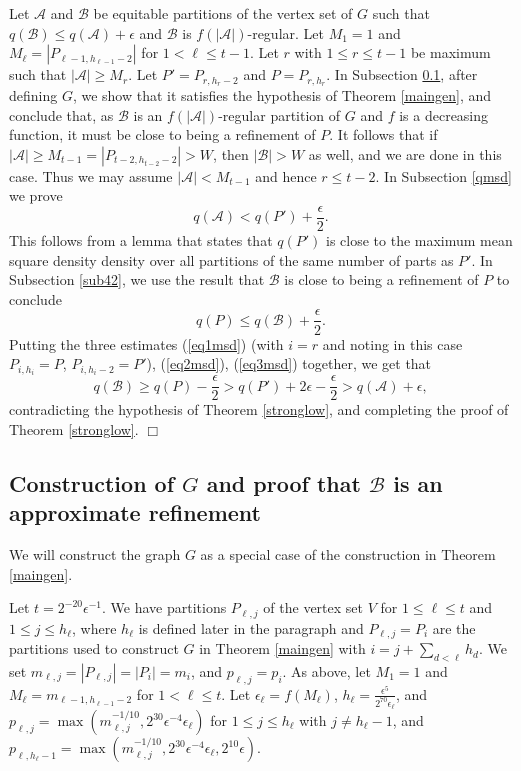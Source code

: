 \documentclass[11pt]{article}
\newcommand{\qed}{\hfill \ensuremath{\Box}}
\begin{document}
Let $\mathcal{A}$ and $\mathcal{B}$ be equitable partitions of the vertex set of $G$ such that 
$q(\mathcal{B}) \leq q(\mathcal{A})+\epsilon$ and $\mathcal{B}$ is
$f(|\mathcal{A}|)$-regular. Let $M_1=1$ and $M_{\ell}=|P_{\ell-1,h_{\ell-1}-2}|$ for $1<\ell \leq t-1$. Let $r$ with $1 \leq r \leq t-1$ be maximum such that $|\mathcal{A}| \geq M_r$. Let
$P'=P_{r,h_r-2}$ and $P=P_{r,h_r}$. In Subsection
\ref{sub41}, after defining $G$, we show that it satisfies the hypothesis of
Theorem \ref{maingen}, and conclude that, as $\mathcal{B}$ is an
$f(|\mathcal{A}|)$-regular partition of $G$ and $f$ is a decreasing function, it must be close to being a
refinement of $P$. It follows that if $|\mathcal{A}| \geq M_{t-1}=|P_{t-2,h_{t-2}-2}| > W$, then $|\mathcal{B}| > W$ as well, and we are done in this case. Thus we may assume $|\mathcal{A}|<M_{t-1}$ and hence $r \leq t-2$. 
In Subsection \ref{qmsd} we prove
\begin{equation}\label{eq2msd}
q(\mathcal{A})<q(P')+\frac{\epsilon}{2}.\end{equation} This follows from a
lemma that states that $q(P')$ is close to the maximum mean square density
density over all partitions of the same number of parts as $P'$. In Subsection \ref{sub42}, we use the result that $\mathcal{B}$ is close to being a
refinement of $P$ to conclude \begin{equation}\label{eq3msd} q(P) \leq
q(\mathcal{B})+\frac{\epsilon}{2}.\end{equation}  Putting the three estimates
(\ref{eq1msd}) (with $i=r$ and noting in this case $P_{i,h_i}=P$,
$P_{i,h_i-2}=P'$), (\ref{eq2msd}), (\ref{eq3msd}) together, we get that
$$q(\mathcal{B}) \geq
q(P)-\frac{\epsilon}{2}>q(P')+2\epsilon-\frac{\epsilon}{2}>q(\mathcal{A})+\epsilon,$$
contradicting the hypothesis of Theorem \ref{stronglow}, and completing the
proof of Theorem \ref{stronglow}. \qed

\subsection{Construction of $G$ and proof that $\mathcal{B}$ is an approximate
refinement}\label{sub41}

We will construct the graph $G$ as a special case of the construction in
Theorem \ref{maingen}.

Let $t=2^{-20}\epsilon^{-1}$. We have
partitions $P_{\ell,j}$ of the vertex set $V$ for $1 \leq \ell \leq t$ and $1
\leq j \leq h_{\ell}$, where $h_{\ell}$ is defined later in the paragraph and
$P_{\ell,j}=P_i$ are the partitions used to construct $G$ in Theorem
\ref{maingen} with $i=j+\sum_{d<\ell}h_d$. We set
$m_{\ell,j}=|P_{\ell,j}|=|P_i|=m_i$, and $p_{\ell,j}=p_i$.
As above, let $M_1=1$ and $M_{\ell}=m_{\ell-1,h_{\ell-1}-2}$ for $1<\ell \leq t$. Let
$\epsilon_{\ell}=f(M_{\ell})$,
$h_{\ell}=\frac{\epsilon^{5}}{2^{70}\epsilon_{\ell}}$, and
$p_{\ell,j}=\max(m_{\ell,j}^{-1/10},2^{30}\epsilon^{-4}\epsilon_{\ell})$ for $1
\leq j \leq h_{\ell}$ with
$j \neq h_{\ell}-1$, and
$p_{\ell,h_{\ell}-1}=\max(m_{\ell,j}^{-1/10},2^{30}\epsilon^{-4}\epsilon_{\ell},2^{10}\epsilon)$.
\end{document}
